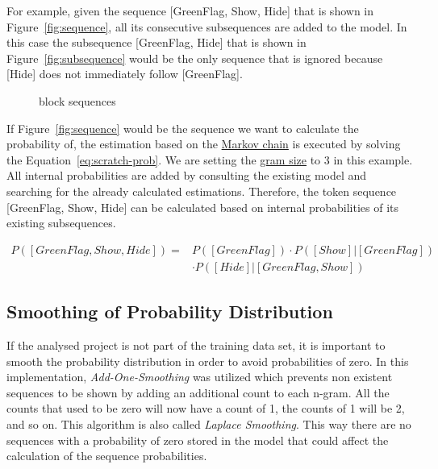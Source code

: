 For example, given the sequence [GreenFlag, Show, Hide] that is shown in Figure~\ref{fig:sequence}, all its consecutive subsequences are added to the model. In this case the subsequence [GreenFlag, Hide] that is shown in Figure~\ref{fig:subsequence} would be the only sequence that is ignored because [Hide] does not immediately follow [GreenFlag]. 

\begin{figure}%
    \centering
    \qquad
    \caption[\scratch{} block sequences]{\label{fig:sequences}\scratch{} block sequences}%
\end{figure}

If Figure~\ref{fig:sequence} would be the sequence we want to calculate the probability of, the estimation based on the \hyperref[def:markov_chain]{Markov chain} is executed by solving the Equation~\ref{eq:scratch-prob}. We are setting the \hyperref[def:gram size]{gram size} to 3 in this example. All internal probabilities are added by consulting the existing model and searching for the already calculated estimations. Therefore, the token sequence [GreenFlag, Show, Hide] can be calculated based on internal probabilities of its existing subsequences.

\begin{equation} \label{eq:scratch-prob}
\begin{aligned}
P([GreenFlag, Show, Hide]) ={} & P([GreenFlag])\cdot P([Show]|[GreenFlag]) \\
							  & \cdot P([Hide]|[GreenFlag, Show])
\end{aligned}
\end{equation}


\subsection{Smoothing of Probability Distribution}\label{subsec:smoothing}
If the analysed project is not part of the training data set, it is important to smooth the probability distribution in order to avoid probabilities of zero. In this implementation, \textit{Add-One-Smoothing} was utilized which prevents non existent sequences to be shown by adding an additional count to each n-gram. All the counts that used to be zero will now have a count of 1, the counts of 1 will be 2, and so on. This algorithm is also called \textit{Laplace Smoothing}. This way there are no sequences with a probability of zero stored in the model that could affect the calculation of the sequence probabilities.

